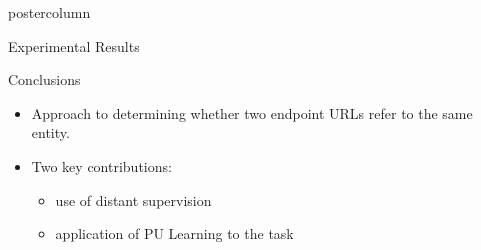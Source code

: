 \documentclass{beamer}
\begin{document}
\begin{frame}
\begin{columns}
\begin{column}{.5\textwidth}
\begin{beamercolorbox}[center]{postercolumn}
\begin{minipage}{.98\textwidth}
{\begin{block}{Experimental Results}
\begin{figure}
              \end{figure}
  
            \end{block}
         
            \begin{block}{Conclusions}
              \begin{itemize}
              \item Approach to determining whether two endpoint URLs refer to the same entity.
              \item Two key contributions:
                \begin{itemize}
                \item  use of distant supervision
                \item  application of PU Learning to the task
                \end{itemize}
              \end{itemize}
	\vspace{0.5em}
            \end{block}
		}\end{minipage}\end{beamercolorbox}
	\end{column}
\end{columns}
\end{frame}
\end{document}
